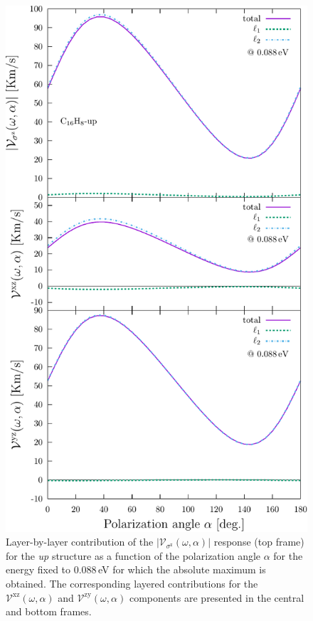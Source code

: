 \documentclass[prb,11pt,tightenlines,twocolumn,aps]{revtex4-1}
\begin{document}
\begin{figure}[t]
    \centering
    \includegraphics[width=\linewidth]{upplots/up-svaz-lay-1}
    
    \caption{Layer-by-layer contribution of the
    $|\mathcal{V}_{\sigma^{\mathrm{z}}}(\omega,\alpha)|$ response (top frame)
    for the \emph{up} structure as a function of the polarization angle
    $\alpha$ for the energy fixed to 0.088\,eV for which the absolute maximum
    is obtained.
    The corresponding layered contributions for the
    $\mathcal{V}^{\mathrm{xz}}(\omega,\alpha)$ and
    $\mathcal{V}^{\mathrm{zy}}(\omega,\alpha)$ components are presented in the
    central and bottom frames.}
    \label{fig:up-vsz-lay-1}
\end{figure}
\end{document}
